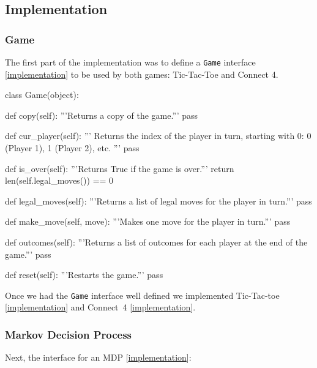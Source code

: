 \documentclass{article}
\newcommand{\GithubURL}[1]{[\href{https://github.com/davidrobles/mlnd-capstone-code/blob/master/#1}{implementation}]}
\begin{document}
\subsection{Implementation}

\subsubsection{Game}

The first part of the implementation was to define a \texttt{Game} interface
\GithubURL{capstone/game/game.py} to be used by both games: Tic-Tac-Toe and Connect 4.

\begin{python}
class Game(object):

    def copy(self):
        '''Returns a copy of the game.'''
        pass

    def cur_player(self):
        '''
        Returns the index of the player in turn, starting with 0:
        0 (Player 1), 1 (Player 2), etc.
        '''
        pass

    def is_over(self):
        '''Returns True if the game is over.'''
        return len(self.legal_moves()) == 0

    def legal_moves(self):
        '''Returns a list of legal moves for the player in turn.'''
        pass

    def make_move(self, move):
        '''Makes one move for the player in turn.'''
        pass

    def outcomes(self):
        '''Returns a list of outcomes for each player at the end of the game.'''
        pass

    def reset(self):
        '''Restarts the game.'''
        pass
\end{python}

Once we had the \texttt{Game} interface well defined we implemented Tic-Tac-toe
\GithubURL{capstone/game/games/tictactoe.py} and \mbox{Connect 4}
\GithubURL{capstone/game/games/connect4.py}.

\subsubsection{Markov Decision Process}

Next, the interface for an MDP \GithubURL{capstone/rl/mdp.py\#L7}:
\end{document}
